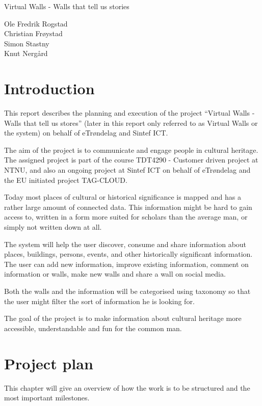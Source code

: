 \documentclass[11pt]{book}
\begin{document}
\frontmatter

\begingroup
\thispagestyle{empty}
\centering
\vspace*{9cm}
\par\normalfont\fontsize{35}{35}\sffamily\selectfont
Virtual Walls - Walls that tell us stories\par
\vspace*{1cm}
{\Huge Ole Fredrik Rogstad\\Christian Frøystad\\Simon Stastny\\Knut Nergård}\par
\endgroup

\tableofcontents

\mainmatter
\chapter{Introduction}
This report describes the planning and execution of the project “Virtual Walls - Walls that tell us stores” (later in this report only referred to as Virtual Walls or the system) on behalf of eTrøndelag and Sintef ICT.

The aim of the project is to communicate and engage people in cultural heritage. The assigned project is part of the course TDT4290 - Customer driven project at NTNU, and also an ongoing project at Sintef ICT on behalf of eTrøndelag and the EU initiated project TAG-CLOUD.

Today most places of cultural or historical significance is mapped and has a rather large amount of connected data. This information might be hard to gain access to, written in a form more suited for scholars than the average man, or simply not written down at all.

The system will help the user discover, consume and share information about places, buildings, persons, events, and other historically significant information. The user can add new information, improve existing information, comment on information or walls, make new walls and share a wall on social media.

Both the walls and the information will be categorised using taxonomy so that the user might filter the sort of information he is looking for.

The goal of the project is to make information about cultural heritage more accessible, understandable and fun for the common man.

\chapter{Project plan}
This chapter will give an overview of how the work is to be structured and the most important milestones.
\end{document}
